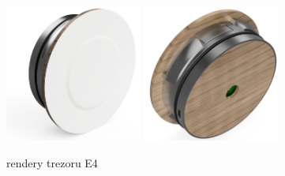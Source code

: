 \begin{figure}[htbp]
    \centering
    \includegraphics[width=170]{kapitoly/obrazky/E4/predni_render.png}
    \includegraphics[width=170]{kapitoly/obrazky/E4/zadni_render.png}
    \caption{rendery trezoru E4}
    \label{fig:E4-render}
\end{figure}

